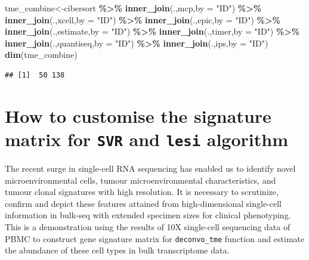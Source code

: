 \documentclass[
  12pt,
]{book}
\newenvironment{Shaded}{\begin{snugshade}}{\end{snugshade}}
\newcommand{\AttributeTok}[1]{\textcolor[rgb]{0.13,0.29,0.53}{#1}}
\newcommand{\FunctionTok}[1]{\textcolor[rgb]{0.13,0.29,0.53}{\textbf{#1}}}
\newcommand{\NormalTok}[1]{#1}
\newcommand{\OtherTok}[1]{\textcolor[rgb]{0.56,0.35,0.01}{#1}}
\newcommand{\SpecialCharTok}[1]{\textcolor[rgb]{0.81,0.36,0.00}{\textbf{#1}}}
\newcommand{\StringTok}[1]{\textcolor[rgb]{0.31,0.60,0.02}{#1}}
\begin{document}
\begin{Shaded}
\begin{Highlighting}[]
\NormalTok{tme\_combine}\OtherTok{\textless{}{-}}\NormalTok{cibersort }\SpecialCharTok{\%\textgreater{}\%} 
  \FunctionTok{inner\_join}\NormalTok{(.,mcp,}\AttributeTok{by       =} \StringTok{"ID"}\NormalTok{) }\SpecialCharTok{\%\textgreater{}\%} 
  \FunctionTok{inner\_join}\NormalTok{(.,xcell,}\AttributeTok{by     =} \StringTok{"ID"}\NormalTok{) }\SpecialCharTok{\%\textgreater{}\%}
  \FunctionTok{inner\_join}\NormalTok{(.,epic,}\AttributeTok{by      =} \StringTok{"ID"}\NormalTok{) }\SpecialCharTok{\%\textgreater{}\%} 
  \FunctionTok{inner\_join}\NormalTok{(.,estimate,}\AttributeTok{by  =} \StringTok{"ID"}\NormalTok{) }\SpecialCharTok{\%\textgreater{}\%} 
  \FunctionTok{inner\_join}\NormalTok{(.,timer,}\AttributeTok{by     =} \StringTok{"ID"}\NormalTok{) }\SpecialCharTok{\%\textgreater{}\%} 
  \FunctionTok{inner\_join}\NormalTok{(.,quantiseq,}\AttributeTok{by =} \StringTok{"ID"}\NormalTok{) }\SpecialCharTok{\%\textgreater{}\%} 
  \FunctionTok{inner\_join}\NormalTok{(.,ips,}\AttributeTok{by       =} \StringTok{"ID"}\NormalTok{)}
\FunctionTok{dim}\NormalTok{(tme\_combine)}
\end{Highlighting}
\end{Shaded}

\begin{verbatim}
## [1]  50 138
\end{verbatim}

\hypertarget{how-to-customise-the-signature-matrix-for-svr-and-lesi-algorithm}{%
\section{\texorpdfstring{How to customise the signature matrix for \texttt{SVR} and \texttt{lesi} algorithm}{How to customise the signature matrix for SVR and lesi algorithm}}\label{how-to-customise-the-signature-matrix-for-svr-and-lesi-algorithm}}

The recent surge in single-cell RNA sequencing has enabled us to identify novel microenvironmental cells, tumour microenvironmental characteristics, and tumour clonal signatures with high resolution. It is necessary to scrutinize, confirm and depict these features attained from high-dimensional single-cell information in bulk-seq with extended specimen sizes for clinical phenotyping. This is a demonstration using the results of 10X single-cell sequencing data of PBMC to construct gene signature matrix for \texttt{deconvo\_tme} function and estimate the abundance of these cell types in bulk transcriptome data.
\end{document}
